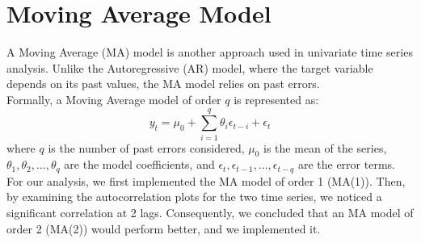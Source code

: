 \section{Moving Average Model}
\label{sec:MA}
A Moving Average (MA) model is another approach used in univariate time series analysis. Unlike the Autoregressive (AR) model, where the target variable depends on its past values, the MA model relies on past errors. \\
Formally, a Moving Average model of order $q$ is represented as:
\begin{equation}
    \label{eq:MA}
    y_{t} = \mu_{0} + \sum^{q}_{i=1} \theta_{i} \epsilon_{t-i} + \epsilon_t
\end{equation}
where $q$ is the number of past errors considered, $\mu_{0}$ is the mean of the series, $\theta_{1}, \theta_{2}, ..., \theta_{q}$ are the model coefficients, and $\epsilon_{t}, \epsilon_{t-1}, ..., \epsilon_{t-q}$ are the error terms. \\
For our analysis, we first implemented the MA model of order 1 (MA(1)). Then, by examining the autocorrelation plots for the two time series, we noticed a significant correlation at 2 lags. Consequently, we concluded that an MA model of order 2 (MA(2)) would perform better, and we implemented it.
